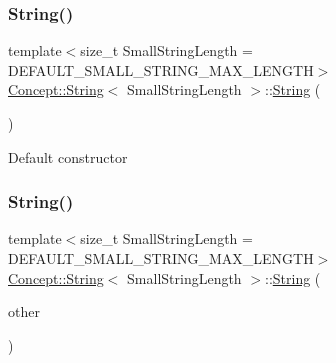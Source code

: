 \subsubsection{\texorpdfstring{String()}{String()}\hspace{0.1cm}{\footnotesize\ttfamily [1/4]}}
{\footnotesize\ttfamily template$<$size\+\_\+t Small\+String\+Length = D\+E\+F\+A\+U\+L\+T\+\_\+\+S\+M\+A\+L\+L\+\_\+\+S\+T\+R\+I\+N\+G\+\_\+\+M\+A\+X\+\_\+\+L\+E\+N\+G\+TH$>$ \\
\mbox{\hyperlink{class_concept_1_1_string}{Concept\+::\+String}}$<$ Small\+String\+Length $>$\+::\mbox{\hyperlink{class_concept_1_1_string}{String}} (\begin{DoxyParamCaption}{ }\end{DoxyParamCaption})\hspace{0.3cm}{\ttfamily [inline]}}

Default constructor \mbox{\label{class_concept_1_1_string_a32c7cfe0b5f891be497b6a5755709239}} 
\subsubsection{\texorpdfstring{String()}{String()}\hspace{0.1cm}{\footnotesize\ttfamily [2/4]}}
{\footnotesize\ttfamily template$<$size\+\_\+t Small\+String\+Length = D\+E\+F\+A\+U\+L\+T\+\_\+\+S\+M\+A\+L\+L\+\_\+\+S\+T\+R\+I\+N\+G\+\_\+\+M\+A\+X\+\_\+\+L\+E\+N\+G\+TH$>$ \\
\mbox{\hyperlink{class_concept_1_1_string}{Concept\+::\+String}}$<$ Small\+String\+Length $>$\+::\mbox{\hyperlink{class_concept_1_1_string}{String}} (\begin{DoxyParamCaption}\item[{const \mbox{\hyperlink{class_concept_1_1_string}{String}}$<$ Small\+String\+Length $>$ \&}]{other }\end{DoxyParamCaption})\hspace{0.3cm}{\ttfamily [inline]}}

